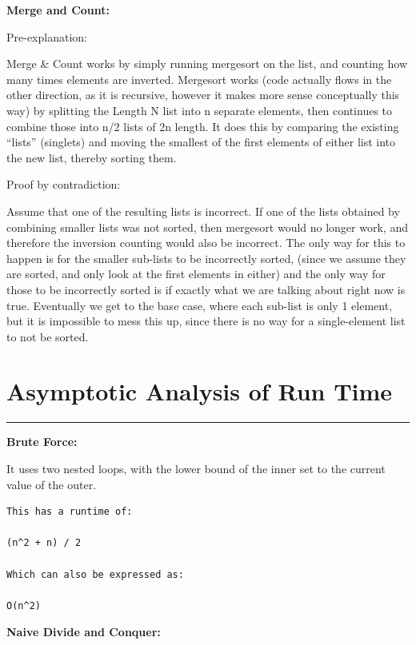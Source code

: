 \documentclass[letterpaper,10pt,titlepage,fleqn]{article}
\begin{document}
\begin{centering}
\textbf{Merge and Count:}
\end{centering}

Pre-explanation:

Merge \& Count works by simply running mergesort on the list, and counting how many times elements are inverted.  Mergesort works (code actually flows in the other direction, as it is recursive, however it makes more sense conceptually this way) by splitting the Length N list into n separate elements, then continues to combine those into n/2 lists of 2n length.  It does this by comparing the existing ``lists'' (singlets) and moving the smallest of the first elements of either list into the new list, thereby sorting them.

Proof by contradiction:

Assume that one of the resulting lists is incorrect.  If one of the lists obtained by combining smaller lists was not sorted, then mergesort would no longer work, and therefore the inversion counting would also be incorrect.  The only way for this to happen is for the smaller sub-lists to be incorrectly sorted, (since we assume they are sorted, and only look at the first elements in either) and the only way for those to be incorrectly sorted is if exactly what we are talking about right now is true.  Eventually we get to the base case, where each sub-list is only 1 element, but it is impossible to mess this up, since there is no way for a single-element list to not be sorted.

\section*{Asymptotic Analysis of Run Time}
\hrule
\begin{centering}
\textbf{Brute Force:}
\end{centering}
It uses two nested loops, with the lower bound of the inner set to the current value of the outer. 

\begin{lstlisting}
This has a runtime of: 

(n^2 + n) / 2 

Which can also be expressed as:

O(n^2)
\end{lstlisting}

\begin{centering}
\textbf{Naive Divide and Conquer:}
\end{centering}
\end{document}
